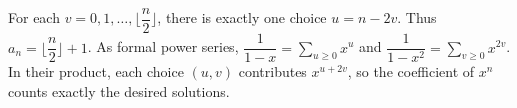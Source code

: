 For each $v=0,1,\ldots,\lfloor\dfrac{n}{2}\rfloor$, there is exactly one choice $u=n-2v$. Thus $\boxed{a_n=\lfloor\dfrac{n}{2}\rfloor+1}$. As formal power series, $\dfrac{1}{1-x}=\sum_{u\ge0}x^u$ and $\dfrac{1}{1-x^2}=\sum_{v\ge0}x^{2v}$. In their product, each choice $(u,v)$ contributes $x^{u+2v}$, so the coefficient of $x^n$ counts exactly the desired solutions.
